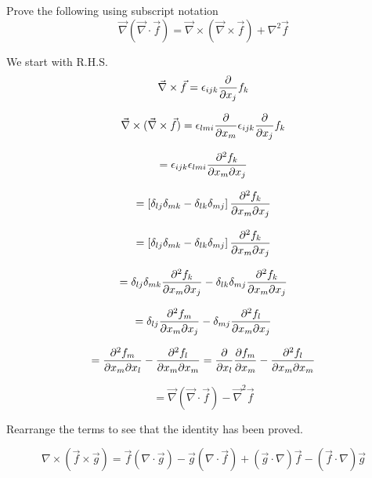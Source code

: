 \begin{question}
Prove the following using subscript notation
$$\vec{\nabla}(\vec{\nabla}\cdot\vec{f}) = \vec{\nabla}\times(\vec{\nabla}\times\vec{f}) + \nabla^2\vec{f}$$
\end{question} 

\begin{solution}[print]
We start with R.H.S.
$$ \vec{\nabla}\times\vec{f} = \epsilon_{ijk} {\partial \over \partial x_j} f_k $$

$$ \vec{\nabla}\times(\vec{\nabla}\times\vec{f}) = \epsilon_{lmi} {\partial \over \partial x_m} \epsilon_{ijk} {\partial \over \partial x_j} f_k $$

$$ = \epsilon_{ijk} \epsilon_{lmi} {\partial^2 f_k \over \partial x_m \partial x_j} $$

$$ = \left[ \delta_{lj}\delta_{mk} - \delta_{lk}\delta_{mj} \right] {\partial^2 f_k \over \partial x_m \partial x_j} $$

$$ = \left[ \delta_{lj}\delta_{mk} - \delta_{lk}\delta_{mj} \right] {\partial^2 f_k \over \partial x_m \partial x_j} $$

$$ = \delta_{lj} \delta_{mk} {\partial^2 f_k \over \partial x_m \partial x_j} - \delta_{lk} \delta_{mj} {\partial^2 f_k \over \partial x_m \partial x_j} $$

$$ = \delta_{lj} {\partial^2 f_m \over \partial x_m \partial x_j} - \delta_{mj} {\partial^2 f_l \over \partial x_m \partial x_j} $$

$$ = {\partial^2 f_m \over \partial x_m \partial x_l} - {\partial^2 f_l \over \partial x_m \partial x_m} = {\partial \over \partial x_l} {\partial f_m \over \partial x_m } - {\partial^2 f_l \over \partial x_m \partial x_m} $$

$$ = \vec{\nabla} \left( \vec{\nabla} \cdot \vec{f} \right) - \vec{\nabla}^2 \vec{f} $$

Rearrange the terms to see that the identity has been proved.

\end{solution}


\begin{question}
$$\nabla\times(\vec{f}\times\vec{g}) = \vec{f} (\nabla\cdot\vec{g}) - \vec{g} (\nabla\cdot\vec{f}) + (\vec{g}\cdot\nabla)\vec{f} - (\vec{f}\cdot\nabla)\vec{g} $$
\end{question} 

